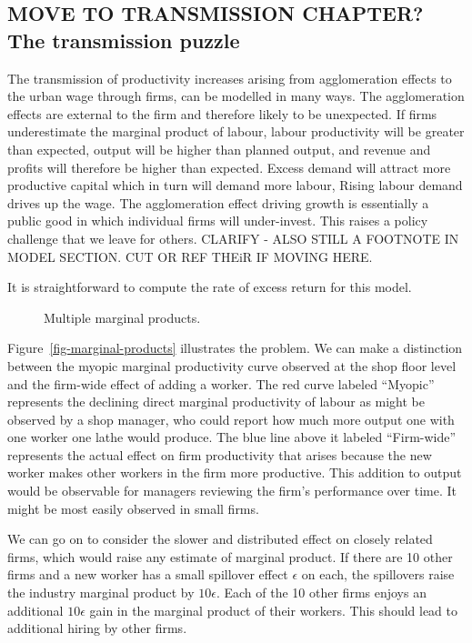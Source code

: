 \subsection{MOVE TO TRANSMISSION CHAPTER? The transmission puzzle}

The transmission of productivity increases arising from agglomeration effects  to the urban wage through firms, can be modelled in many ways. The agglomeration effects are external to the firm and therefore likely to be unexpected. If  firms underestimate the marginal product of labour, labour productivity will be greater than expected, output will be higher than planned output, and revenue and profits will therefore be higher than expected. Excess demand will attract more productive capital which in turn will demand more labour,  Rising labour demand drives up the wage. The agglomeration effect driving growth is essentially a public good in which individual firms will under-invest. This raises a policy challenge that we leave for others. CLARIFY - ALSO STILL A FOOTNOTE IN MODEL SECTION. CUT OR REF THEiR IF MOVING HERE.

 It is straightforward to compute the rate of excess return for  this model. 


\begin{figure}
\centering

\caption{Multiple marginal products.}
\label{fig-multiple-marginal-products}
\end{figure}



Figure~\ref{fig-marginal-products} illustrates the problem. We can  make a distinction between the myopic marginal productivity curve observed  at the shop floor level and  the firm-wide effect of adding a worker. The red curve labeled ``Myopic'' represents the declining direct marginal productivity of labour as  might be observed by a shop manager, who could report how much more output one with one worker one lathe would produce. The blue line above it labeled ``Firm-wide'' represents the actual effect on firm productivity that arises because the new worker makes other workers in the firm more productive. This addition to output would be observable for managers reviewing the firm's performance over time. It might be most easily observed in small firms. 

We can go on to consider the slower and distributed effect on closely related firms, which would raise any estimate of marginal product.  If there are 10 other firms and a new worker  has a small spillover effect  $\epsilon$ on each,  the spillovers raise the industry  marginal product  by $10\epsilon$. Each of the  10 other firms  enjoys  an additional $10\epsilon$ gain in the marginal product of their workers. This should lead to additional hiring by other firms.


